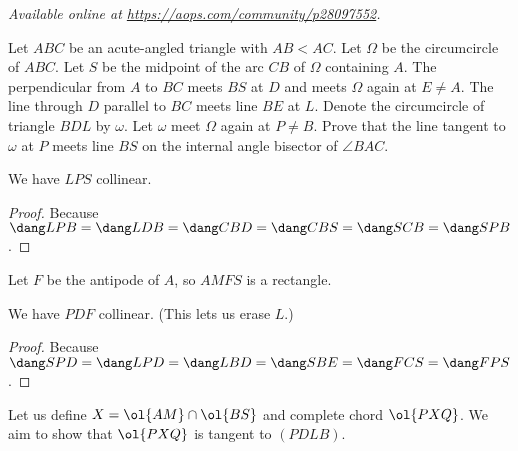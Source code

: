 \textsl{Available online at \url{https://aops.com/community/p28097552}.}
\begin{mdframed}[style=mdpurplebox,frametitle={Problem statement}]
Let $ABC$ be an acute-angled triangle with $AB < AC$.
Let $\Omega$ be the circumcircle of $ABC$.
Let $S$ be the midpoint of the arc $CB$ of $\Omega$ containing $A$.
The perpendicular from $A$ to $BC$ meets $BS$ at $D$ and meets $\Omega$ again at $E \neq A$.
The line through $D$ parallel to $BC$ meets line $BE$ at $L$.
Denote the circumcircle of triangle $BDL$ by $\omega$.
Let $\omega$ meet $\Omega$ again at $P \neq B$.
Prove that the line tangent to $\omega$ at $P$ meets line $BS$
on the internal angle bisector of $\angle BAC$.
\end{mdframed}
\begin{claim*}
  We have $LPS$ collinear.
\end{claim*}
\begin{proof}
  Because $\dang LPB = \dang LDB = \dang CBD = \dang CBS = \dang SCB = \dang SPB$.
\end{proof}

Let $F$ be the antipode of $A$, so $AMFS$ is a rectangle.
\begin{claim*}
  We have $PDF$ collinear. (This lets us erase $L$.)
\end{claim*}
\begin{proof}
   Because $\dang SPD = \dang LPD = \dang LBD = \dang SBE = \dang FCS = \dang FPS$.
\end{proof}

Let us define $X = \ol{AM} \cap \ol{BS}$ and complete chord $\ol{PXQ}$.
We aim to show that $\ol{PXQ}$ is tangent to $(PDLB)$.

